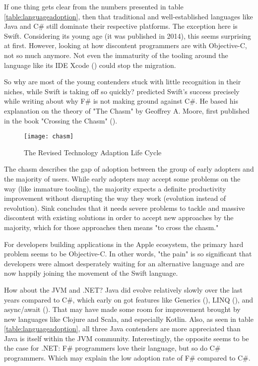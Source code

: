 If one thing gets clear from the numbers presented in table \ref{table:languageadoption}, then that traditional and well-established languages like Java and C\# still dominate their respective platforms. The exception here is Swift. Considering its young age (it was published in 2014), this seems surprising at first. However, looking at how discontent programmers are with Objective-C, not so much anymore. Not even the immaturity of the tooling around the language like its IDE Xcode (\cite{reboucas_empirical_2016}) could stop the migration.

So why are most of the young contenders stuck with little recognition in their niches, while Swift is taking off so quickly? \cite{sink_why_2015} predicted Swift's success precisely while writing about why F\# is not making ground against C\#. He based his explanation on the theory of "The Chasm" by Geoffrey A. Moore, first published in the book "Crossing the Chasm" (\cite{moore_crossing_1991}).

\begin{figure}[h]
\centering
\caption{The Revised Technology Adaption Life Cycle}
\label{fig:chasm}
\texttt{[image: chasm]}
\end{figure}

The chasm describes the gap of adoption between the group of early adopters and the majority of users. While early adopters may accept some problems on the way (like immature tooling), the majority expects a definite productivity improvement without disrupting the way they work (evolution instead of revolution). Sink concludes that it needs severe problems to tackle and massive discontent with existing solutions in order to accept new approaches by the majority, which for those approaches then means "to cross the chasm."

For developers building applications in the Apple ecosystem, the primary hard problem seems to be Objective-C. In other words, "the pain" is so significant that developers were almost desperately waiting for an alternative language and are now happily joining the movement of the Swift language.

How about the JVM and .NET? Java did evolve relatively slowly over the last years compared to C\#, which early on got features like Generics (\cite{kennedy_design_2001}), LINQ (\cite{meijer_linq:_2006}), and async/await (\cite{hejlsberg_introducing_2010}). That may have made some room for improvement brought by new languages like Clojure and Scala, and especially Kotlin. Also, as seen in table \ref{table:languageadoption}, all three Java contenders are more appreciated than Java is itself within the JVM community. Interestingly, the opposite seems to be the case for .NET: F\# programmers love their language, but so do C\# programmers. Which may explain the low adoption rate of F\# compared to C\#. 

